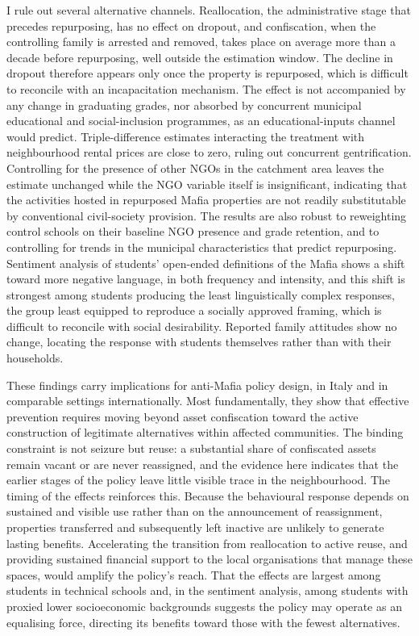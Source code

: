 \documentclass[12pt]{article}
\theoremstyle{plain}
\theoremstyle{plain}
\theoremstyle{plain}
\theoremstyle{definition}
\theoremstyle{plain}
\theoremstyle{definition}
\theoremstyle{plain}
\theoremstyle{remark}
\theoremstyle{definition}
\theoremstyle{definition}
\theoremstyle{plain}
\begin{document}
I rule out several alternative channels. Reallocation, the administrative stage that precedes repurposing, has no effect on dropout, and confiscation, when the controlling family is arrested and removed, takes place on average more than a decade before repurposing, well outside the estimation window. The decline in dropout therefore appears only once the property is repurposed, which is difficult to reconcile with an incapacitation mechanism. The effect is not accompanied by any change in graduating grades, nor absorbed by concurrent municipal educational and social-inclusion programmes, as an educational-inputs channel would predict. Triple-difference estimates interacting the treatment with neighbourhood rental prices are close to zero, ruling out concurrent gentrification. Controlling for the presence of other NGOs in the catchment area leaves the estimate unchanged while the NGO variable itself is insignificant, indicating that the activities hosted in repurposed Mafia properties are not readily substitutable by conventional civil-society provision. The results are also robust to reweighting control schools on their baseline NGO presence and grade retention, and to controlling for trends in the municipal characteristics that predict repurposing. Sentiment analysis of students' open-ended definitions of the Mafia shows a shift toward more negative language, in both frequency and intensity, and this shift is strongest among students producing the least linguistically complex responses, the group least equipped to reproduce a socially approved framing, which is difficult to reconcile with social desirability. Reported family attitudes show no change, locating the response with students themselves rather than with their households.

These findings carry implications for anti-Mafia policy design, in Italy and in comparable settings internationally. Most fundamentally, they show that effective prevention requires moving beyond asset confiscation toward the active construction of legitimate alternatives within affected communities. The binding constraint is not seizure but reuse: a substantial share of confiscated assets remain vacant or are never reassigned, and the evidence here indicates that the earlier stages of the policy leave little visible trace in the neighbourhood. The timing of the effects reinforces this. Because the behavioural response depends on sustained and visible use rather than on the announcement of reassignment, properties transferred and subsequently left inactive are unlikely to generate lasting benefits. Accelerating the transition from reallocation to active reuse, and providing sustained financial support to the local organisations that manage these spaces, would amplify the policy's reach. That the effects are largest among students in technical schools and, in the sentiment analysis, among students with proxied lower socioeconomic backgrounds suggests the policy may operate as an equalising force, directing its benefits toward those with the fewest alternatives.
\end{document}
